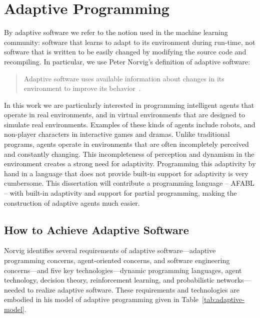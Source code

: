 \section{Adaptive Programming}

By adaptive software we refer to the notion used in the machine learning community: software that learns to adapt to its environment during run-time, not software that is written to be easily changed by modifying the source code and recompiling.  In particular, we use Peter Norvig's definition of adaptive software:

\begin{quote}
Adaptive software uses available information about changes in its
environment to improve its behavior~\cite{norvig1998adaptive}.
\end{quote}

In this work we are particularly interested in programming intelligent agents that operate in real environments, and in virtual environments that are designed to simulate real environments.  Examples of these kinds of agents include robots, and non-player characters in interactive games and dramas.  Unlike traditional programs, agents operate in environments that are often incompletely perceived and constantly changing.  This incompleteness of perception and dynamism in the environment creates a strong need for adaptivity.  Programming this adaptivity by hand in a language that does not provide built-in support for adaptivity is very cumbersome.  This dissertation will contribute a programming language -- AFABL -- with built-in adaptivity and support for partial programming, making the construction of adaptive agents much easier.


\subsection{How to Achieve Adaptive Software}

Norvig identifies several requirements of adaptive
soft\-ware---adaptive programming concerns, agent-oriented concerns,
and software engineering concerns---and five key
technologies---dynamic programming languages, agent technology,
decision theory, reinforcement learning, and probabilistic
networks---needed to realize adaptive software.  These requirements
and technologies are embodied in his model of adaptive programming
given in Table~\ref{tab:adaptive-model}.

